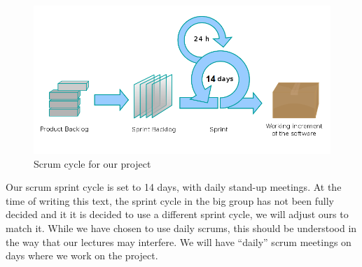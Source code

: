 \begin{figure}[h]
	\centering
		\includegraphics[width=1.00\textwidth]{scrumcycle.png}
	 \caption{Scrum cycle for our project}
         \label{fig:scrumcycle}
\end{figure}

Our scrum sprint cycle is set to 14 days, with daily stand-up meetings. At the time of writing this text, the sprint cycle in the big group has not been fully decided and it it is decided to use a different
sprint cycle, we will adjust ours to match it. While we have chosen to use daily scrums, this should be understood in the way that our lectures may interfere. We will have ``daily'' scrum meetings
on days where we work  on the project. 


